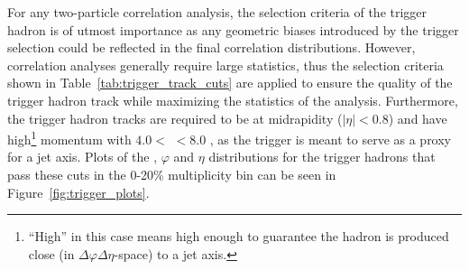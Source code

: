 For any two-particle correlation analysis, the selection criteria of the trigger hadron is of utmost importance as any geometric biases introduced by the trigger selection could be reflected in the final correlation distributions. However, correlation analyses generally require large statistics, thus the selection criteria shown in Table~\ref{tab:trigger_track_cuts} are applied to ensure the quality of the trigger hadron track while maximizing the statistics of the analysis. Furthermore, the trigger hadron tracks are required to be at midrapidity ($|\eta| < 0.8$) and have high\footnote{``High'' in this case means high enough to guarantee the hadron is produced close (in $\Delta\varphi\Delta\eta$-space) to a jet axis.} momentum with $4.0 <$ \pttrig $< 8.0$ \GeVc, as the trigger is meant to serve as a proxy for a jet axis. Plots of the \pt, $\varphi$ and $\eta$ distributions for the trigger hadrons that pass these cuts in the 0-20\% multiplicity bin can be seen in Figure~\ref{fig:trigger_plots}.

